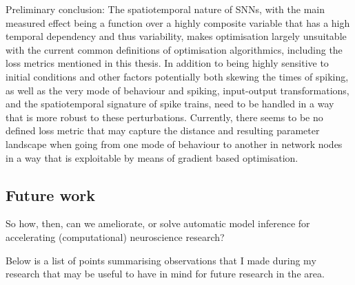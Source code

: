 \documentclass[mphil,deptreport,ai]{infthesis} %
\begin{document}
Preliminary conclusion: The spatiotemporal nature of SNNs, with the main measured effect being a function over a highly composite variable that has a high temporal dependency and thus variability, makes optimisation largely unsuitable with the current common definitions of optimisation algorithmics, including the loss metrics mentioned in this thesis.
In addition to being highly sensitive to initial conditions and other factors potentially both skewing the times of spiking, as well as the very mode of behaviour and spiking, input-output transformations, and the spatiotemporal signature of spike trains, need to be handled in a way that is more robust to these perturbations. 
Currently, there seems to be no defined loss metric that may capture the distance and resulting parameter landscape when going from one mode of behaviour to another in network nodes in a way that is exploitable by means of gradient based optimisation.

\subsection{Future work}

So how, then, can we ameliorate, or solve automatic model inference for accelerating (computational) neuroscience research?

Below is a list of points summarising observations that I made during my research that may be useful to have in mind for future research in the area.
\end{document}
